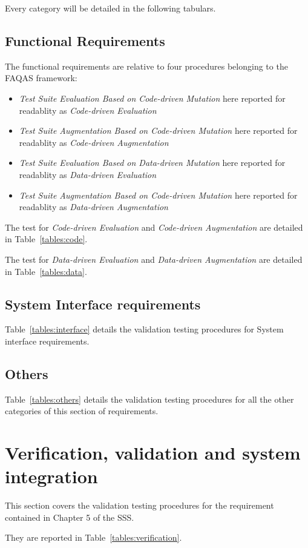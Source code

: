  Every category will be detailed in the following tabulars.

\subsection{Functional Requirements}

The functional requirements are relative to four procedures belonging to the FAQAS framework:
\begin{itemize}
  \item \emph{Test Suite Evaluation Based on Code-driven Mutation} here reported for readablity as \emph{Code-driven Evaluation}
  \item \emph{Test Suite Augmentation Based on Code-driven Mutation} here reported for readablity as \emph{Code-driven Augmentation}
  \item \emph{Test Suite Evaluation Based on Data-driven Mutation} here reported for readablity as \emph{Data-driven Evaluation}
  \item \emph{Test Suite Augmentation Based on Code-driven Mutation} here reported for readablity as \emph{Data-driven Augmentation}
\end{itemize}

The test for \emph{Code-driven Evaluation} and \emph{Code-driven Augmentation} are detailed in Table~\ref{tables:code}.



The test for \emph{Data-driven Evaluation} and \emph{Data-driven Augmentation} are detailed in Table~\ref{tables:data}.



\subsection{System Interface requirements}

Table~\ref{tables:interface} details the validation testing procedures for System interface requirements.



\subsection{Others}

Table~\ref{tables:others} details the validation testing procedures for all the other categories of this section of requirements.



\section{Verification, validation and system integration}

This section covers the validation testing procedures for the requirement contained in Chapter 5 of the SSS.

They are reported in Table~\ref{tables:verification}.


